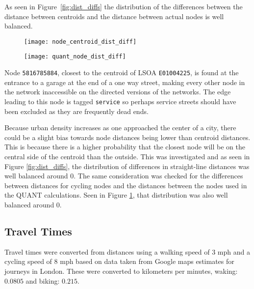 As seen in Figure~\ref{fig:dist_diffs} the distribution of the differences between the distance between centroids and the distance between actual nodes is well balanced. 

\begin{figure}
\centering
\begin{minipage}{.5\textwidth}
  \centering
  \texttt{[image: node\_centroid\_dist\_diff]}
  \label{fig:dist_diffs}
\end{minipage}%
\begin{minipage}{.5\textwidth}
  \centering
  \texttt{[image: quant\_node\_dist\_diff]}
  \label{fig:quant_dist_diffs}
\end{minipage}
\end{figure}

Node \texttt{5816785884}, closest to the centroid of LSOA \texttt{E01004225}, is found at the entrance to a garage at the end of a one way street, making every other node in the network inaccessible on the directed versions of the networks. The edge leading to this node is tagged \texttt{service} so perhaps service streets should have been excluded as they are frequently dead ends. 

Because urban density increases as one approached the center of a city, there could be a slight bias towards node distances being lower than centroid distances. This is because there is a higher probability that the closest node will be on the central side of the centroid than the outside. This was investigated and as seen in Figure \ref{fig:dist_diffs}, the distribution of differences in straight-line distances was well balanced around 0. The same consideration was checked for the differences between distances for cycling nodes and the distances between the nodes used in the QUANT calculations. Seen in Figure \ref{fig:quant_dist_diffs}, that distribution was also well balanced around 0. 

\subsection{Travel Times}

Travel times were converted from distances using a walking speed of 3 mph and a cycling speed of 8 mph based on data taken from Google maps estimates for journeys in London. These were converted to kilometers per minutes, waking: $0.0805$ and biking: $0.215$. 

